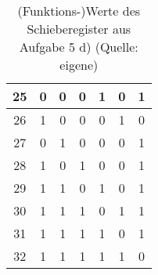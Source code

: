 \begin{table}[h!]
\begin{tabular}{|c|c|c|c|c|c|c|}
        \hline
        25 &  0 &  0 &  0 & 1 & 0 & 1  \\
        \hline
        26 &  1 & 0 &  0 &  0 & 1 & 0 \\
        \hline
        27 &  0 & 1 & 0 &  0 &  0 & 1 \\
        \hline
        28 &  1 & 0 & 1 & 0 &  0 &  1  \\
        \hline
        29 &  1 &  1 & 0 & 1 & 0 &  1  \\
        \hline
        30 &  1 & 1 &  1 & 0 & 1 & 1 \\
        \hline
        31 &  1 & 1 & 1 &  1 & 0 & 1  \\
        \hline
        32 &  1 & 1 & 1 & 1 &  1 & 0 \\
        \hline
    \end{tabular}
    \caption{(Funktions-)Werte des Schieberegister aus Aufgabe 5 d) (Quelle: eigene)}
    \label{tab:schieberegister}
\end{table}